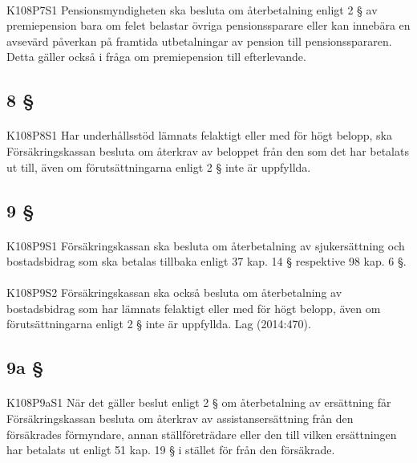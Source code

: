 \documentclass[a4paper,notitlepage,openany,10pt]{book}
\begin{document}
\paragraph*{}
{\tiny K108P7S1}
Pensionsmyndigheten ska besluta om återbetalning enligt 2 § av premiepension bara om felet belastar övriga pensionssparare eller kan innebära en avsevärd påverkan på framtida utbetalningar av pension till pensionsspararen. Detta gäller också i fråga om premiepension till efterlevande.
\subsection*{8 §}
\paragraph*{}
{\tiny K108P8S1}
Har underhållsstöd lämnats felaktigt eller med för högt belopp, ska Försäkringskassan besluta om återkrav av beloppet från den som det har betalats ut till, även om förutsättningarna enligt 2 § inte är uppfyllda.
\subsection*{9 §}
\paragraph*{}
{\tiny K108P9S1}
Försäkringskassan ska besluta om återbetalning av sjukersättning och bostadsbidrag som ska betalas tillbaka enligt 37 kap. 14 § respektive 98 kap. 6 §.
\paragraph*{}
{\tiny K108P9S2}
Försäkringskassan ska också besluta om återbetalning av bostadsbidrag som har lämnats felaktigt eller med för högt belopp, även om förutsättningarna enligt 2 § inte är uppfyllda.
Lag (2014:470).
\subsection*{9a §}
\paragraph*{}
{\tiny K108P9aS1}
När det gäller beslut enligt 2 § om återbetalning av ersättning får Försäkringskassan besluta om återkrav av assistansersättning från den försäkrades förmyndare, annan ställföreträdare eller den till vilken ersättningen har betalats ut enligt 51 kap. 19 § i stället för från den försäkrade.
\end{document}
